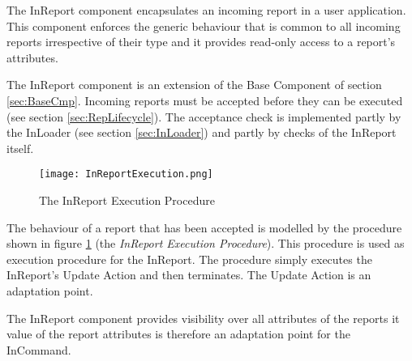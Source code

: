 The InReport component encapsulates an incoming report in a user application. This component enforces the generic behaviour that is common to all incoming reports irrespective of their type and it provides read-only access to a report's attributes.

The InReport component is an extension of the Base Component of section \ref{sec:BaseCmp}. Incoming reports must be accepted before they can be executed (see section \ref{sec:RepLifecycle}). The acceptance check is implemented partly by the InLoader (see section \ref{sec:InLoader}) and partly by  checks of the InReport itself.

\begin{figure}[h]
 \centering
 \texttt{[image: InReportExecution.png]}
 \caption{The InReport Execution Procedure}
 \label{fig:InReportExecution}
\end{figure}

The behaviour of a report that has been accepted is modelled by the procedure shown in figure \ref{fig:InReportExecution} (the \textit{InReport Execution Procedure}). This procedure is used as execution procedure for the InReport. The procedure simply executes the InReport's Update Action and then terminates. The Update Action is an adaptation point.

The InReport component provides visibility over all attributes of the reports it  value of the report attributes is therefore an adaptation point for the InCommand.

